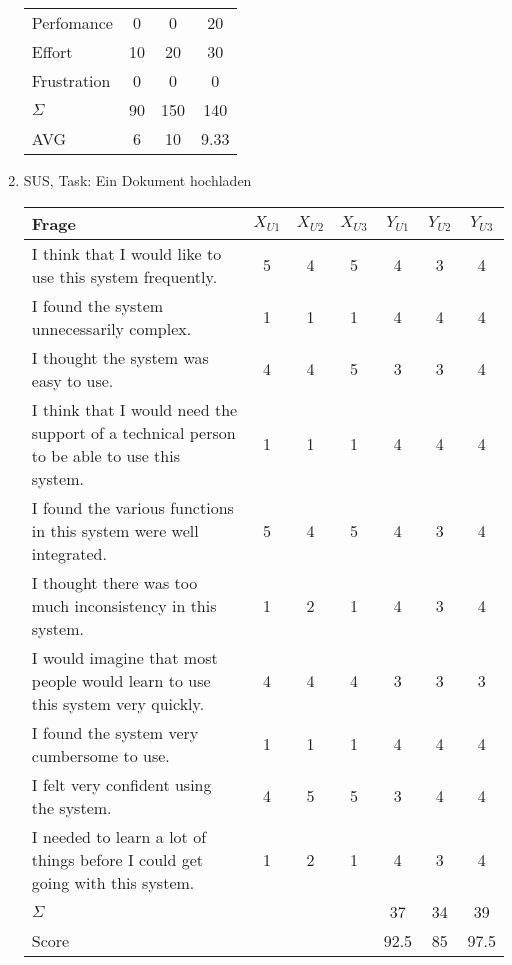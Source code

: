 \documentclass{article}
\begin{document}
\begin{enumerate}[label=(\alph*)]
\begin{center}
\begin{tabular}{l|c|c|c}
				Perfomance & 0 & 0 & 20 \\
				Effort & 10 & 20 & 30 \\
				Frustration & 0 & 0 & 0 \\
				\hline
				$\Sigma$ & 90 & 150 & 140 \\
				AVG & 6 & 10 & 9.33
			\end{tabular}
		\end{center}
		\item SUS, Task: Ein Dokument hochladen
		\begin{center}
			\begin{tabular}{L{7cm}|c|c|c|c|c|c}
				\textbf{Frage} & $X_{U1}$ & $X_{U2}$ & $X_{U3}$ & $Y_{U1}$ & $Y_{U2}$ & $Y_{U3}$ \\
				\hline
				 I think that I would like to use this system frequently. & 5 & 4 & 5 & 4 & 3 & 4 \\
				 I found the system unnecessarily complex. & 1 & 1 & 1 & 4 & 4 & 4 \\
				 I thought the system was easy to use. & 4 & 4 & 5 & 3 & 3 & 4 \\
				 I think that I would need the support of a technical person to be able to use this system. & 1 & 1 & 1 & 4 & 4 & 4 \\
				 I found the various functions in this system were well integrated. & 5 & 4 & 5 & 4 & 3 & 4 \\
				 I thought there was too much inconsistency in this system. & 1 & 2 & 1 & 4 & 3 & 4 \\
				 I would imagine that most people would learn to use this system very quickly. & 4 & 4 & 4 & 3 & 3 & 3 \\
				 I found the system very cumbersome to use. & 1 & 1 & 1 & 4 & 4 & 4 \\
				 I felt very confident using the system. & 4 & 5 & 5 & 3 & 4 & 4 \\
				 I needed to learn a lot of things before I could get going with this system. & 1 & 2 & 1 & 4 & 3 & 4 \\
				 \hline
				 $\Sigma$ & & & & 37 & 34 & 39 \\
				 \hline
				 Score & & & & 92.5 & 85 & 97.5
			\end{tabular}
		\end{center}
	\end{enumerate}
\end{document}
